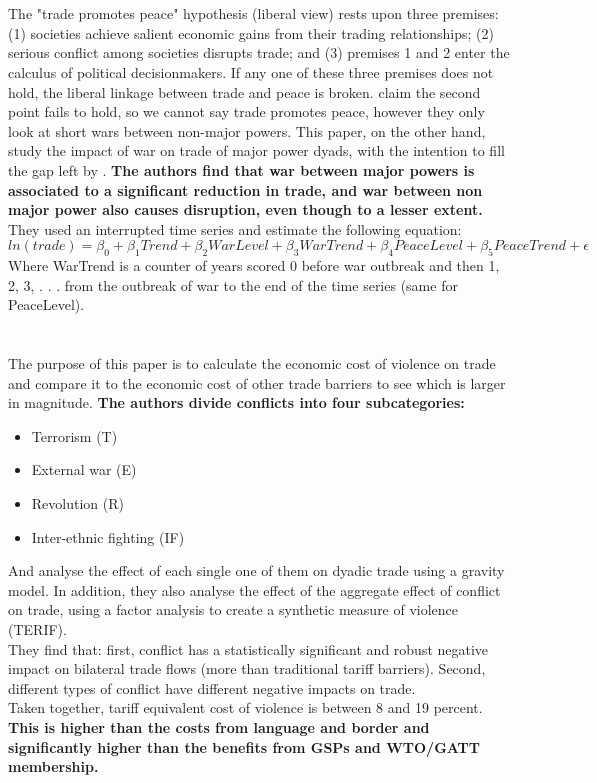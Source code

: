 \documentclass[12pt,a4paper,titlepage,english]{article}
\begin{document}
\section*{\cite{anderton2001impact}}
The "trade promotes peace" hypothesis (liberal view) rests upon three premises: (1) societies achieve salient economic gains from their trading relationships; (2) serious conflict among societies disrupts trade; and (3) premises 1 and 2 enter the calculus of political decisionmakers. If any one of these three premises does not hold, the liberal linkage between trade and peace is broken. \cite{barbieri1999sleeping} claim the second point fails to hold, so we cannot say trade promotes peace, however they only look at short wars between non-major powers. This paper, on the other hand, study the impact of war on trade of major power dyads, with the intention to fill the gap left by \cite{barbieri1999sleeping}. \textbf{The authors find that war between major powers is associated to a significant reduction in trade, and war between non major power also causes disruption, even though to a lesser extent.} They used an interrupted time series and estimate the following equation: 
\begin{equation*}
ln(trade)=\beta_0+\beta_1Trend+\beta_2WarLevel+\beta_3WarTrend+\beta_4PeaceLevel+\beta_5PeaceTrend+\epsilon
\end{equation*}
Where WarTrend is a counter of years scored 0 before war outbreak and then 1, 2, 3, . . . from the outbreak of war to the end of the time series (same for PeaceLevel).

\section*{\cite{blomberg2006much}}
The purpose of this paper is to calculate the economic cost of violence on trade and compare it to the economic cost of other trade barriers to see which is larger in magnitude. \textbf{The authors divide conflicts into four subcategories:} 
\begin{itemize}
\item{Terrorism (T)}
\item{External war (E)}
\item{Revolution (R)}
\item{Inter-ethnic fighting (IF)}
\end{itemize}
And analyse the effect of each single one of them on dyadic trade using a gravity model. In addition, they also analyse the effect of the aggregate effect of conflict on trade, using a factor analysis to create a synthetic measure of violence (TERIF). \\
They find that: first, conflict has a statistically significant and robust negative impact on bilateral trade flows (more than traditional tariff barriers). Second, different types of conflict have different negative impacts on trade. \\
Taken together, tariff equivalent cost of violence is between 8 and 19 percent. \textbf{This is higher than the costs from language and border and significantly higher than the benefits from GSPs and WTO/GATT membership.}
\end{document}
